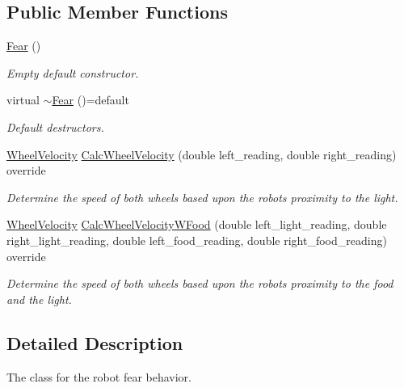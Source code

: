 \subsection*{Public Member Functions}
\begin{DoxyCompactItemize}
\item 
\mbox{\label{class_fear_a2a7cfce798f1b86f73510a62232975f8}} 
\mbox{\hyperlink{class_fear_a2a7cfce798f1b86f73510a62232975f8}{Fear}} ()
\begin{DoxyCompactList}\small\item\em Empty default constructor. \end{DoxyCompactList}\item 
\mbox{\label{class_fear_a571e48276ff3e227caf1d2d3445ed100}} 
virtual \mbox{\hyperlink{class_fear_a571e48276ff3e227caf1d2d3445ed100}{$\sim$\+Fear}} ()=default
\begin{DoxyCompactList}\small\item\em Default destructors. \end{DoxyCompactList}\item 
\mbox{\hyperlink{struct_wheel_velocity}{Wheel\+Velocity}} \mbox{\hyperlink{class_fear_a17242c34a557281ad98d37073f590c45}{Calc\+Wheel\+Velocity}} (double left\+\_\+reading, double right\+\_\+reading) override
\begin{DoxyCompactList}\small\item\em Determine the speed of both wheels based upon the robots proximity to the light. \end{DoxyCompactList}\item 
\mbox{\hyperlink{struct_wheel_velocity}{Wheel\+Velocity}} \mbox{\hyperlink{class_fear_a24a9b3c3dec205cb973eb15416795129}{Calc\+Wheel\+Velocity\+W\+Food}} (double left\+\_\+light\+\_\+reading, double right\+\_\+light\+\_\+reading, double left\+\_\+food\+\_\+reading, double right\+\_\+food\+\_\+reading) override
\begin{DoxyCompactList}\small\item\em Determine the speed of both wheels based upon the robots proximity to the food and the light. \end{DoxyCompactList}\end{DoxyCompactItemize}


\subsection{Detailed Description}
The class for the robot fear behavior. 

